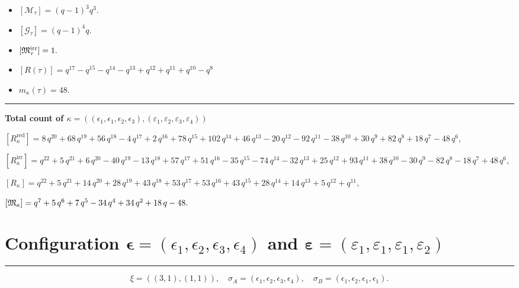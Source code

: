 \documentclass[10pt,a4paper]{amsart}
\begin{document}
\begin{itemize}
 \item $[\mathcal{M}_{\tau}] = {\left(q - 1\right)}^{3} q^{3} .$

 \item $[\mathcal{G}_{\tau}] = {\left(q - 1\right)}^{4} q .$

 \item $[{\frak M}_{\tau}^{\textrm{irr}}] = 1 .$

 \item $[R(\tau)] = q^{17} - q^{15} - q^{14} - q^{13} + q^{12} + q^{11} + q^{10} - q^{8} $

 \item $m_{\kappa}(\tau) = 48 .$

 \end{itemize}
\noindent\rule{9cm}{2pt}\vspace{0.2cm}

\noindent\textbf{Total count of $\kappa = ((\epsilon_1,\epsilon_1,\epsilon_2,\epsilon_3), (\varepsilon_1,\varepsilon_2,\varepsilon_3,\varepsilon_4))$}\medskip

${[R_{\kappa}^{\textrm{red}}]} = 8 \, q^{20} + 68 \, q^{19} + 56 \, q^{18} - 4 \, q^{17} + 2 \, q^{16} + 78 \, q^{15} + 102 \, q^{14} + 46 \, q^{13} - 20 \, q^{12} - 92 \, q^{11} - 38 \, q^{10} + 30 \, q^{9} + 82 \, q^{8} + 18 \, q^{7} - 48 \, q^{6} ,$

${[R_{\kappa}^{\textrm{irr}}]} = q^{22} + 5 \, q^{21} + 6 \, q^{20} - 40 \, q^{19} - 13 \, q^{18} + 57 \, q^{17} + 51 \, q^{16} - 35 \, q^{15} - 74 \, q^{14} - 32 \, q^{13} + 25 \, q^{12} + 93 \, q^{11} + 38 \, q^{10} - 30 \, q^{9} - 82 \, q^{8} - 18 \, q^{7} + 48 \, q^{6} ,$

${[R_{\kappa}]} = q^{22} + 5 \, q^{21} + 14 \, q^{20} + 28 \, q^{19} + 43 \, q^{18} + 53 \, q^{17} + 53 \, q^{16} + 43 \, q^{15} + 28 \, q^{14} + 14 \, q^{13} + 5 \, q^{12} + q^{11} ,$

${[{\frak M}_{\kappa}]} = q^{7} + 5 \, q^{6} + 7 \, q^{5} - 34 \, q^{4} + 34 \, q^{2} + 18 \, q - 48 .$

\newpage{}

\section{Configuration $\bm{\epsilon} = (\epsilon_1,\epsilon_2,\epsilon_3,\epsilon_4)$ and $\bm{\varepsilon} =(\varepsilon_1,\varepsilon_1,\varepsilon_1,\varepsilon_2)$}
\noindent\rule{8cm}{0.4pt}

$$\xi = ({(3, 1), (1, 1)}),\quad \sigma_A = ({{\epsilon_1, \epsilon_2, \epsilon_3}, {\epsilon_4}}),\quad \sigma_B = ({{\epsilon_1, \epsilon_2, \epsilon_1}, {\epsilon_1}}).$$
\end{document}
